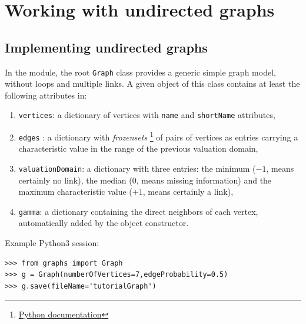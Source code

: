 \chapter{Working with undirected graphs}
\label{sec:21}

\abstract*{}

\abstract{}

\section{Implementing undirected graphs}
\label{sec:21.1}

In the  module, the root \texttt{Graph} class provides a generic simple graph model, without loops and multiple links. A given object of this class contains at least the following attributes in:
\begin{enumerate}
\item \texttt{vertices}: a dictionary of vertices with \texttt{name} and \texttt{shortName} attributes,
\item \texttt{edges} : a dictionary with \emph{frozensets} \footnote{\href{https://docs.python.org/3.9/library/stdtypes.html?highlight=frozenset\#frozenset}{Python documentation}} of pairs of vertices as entries carrying a characteristic value in the range of the previous valuation domain,
\item \texttt{valuationDomain}: a dictionary with three entries: the minimum ($-1$, means certainly no link), the median ($0$, means missing information) and the maximum characteristic value ($+1$, means certainly a link),
\item \texttt{gamma}: a dictionary containing the direct neighbors of each vertex, automatically added by the object constructor.
\end{enumerate}

Example Python3 session:
\begin{lstlisting}
>>> from graphs import Graph
>>> g = Graph(numberOfVertices=7,edgeProbability=0.5)
>>> g.save(fileName='tutorialGraph')
\end{lstlisting}

